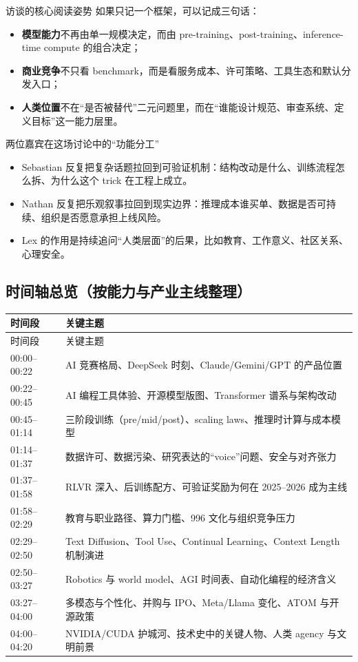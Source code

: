 \documentclass[a4paper]{article}
\begin{document}
\begin{importantbox}{访谈的核心阅读姿势}
如果只记一个框架，可以记成三句话：
\begin{itemize}[leftmargin=1.5em]
    \item \textbf{模型能力}不再由单一规模决定，而由 pre-training、post-training、inference-time compute 的组合决定；
    \item \textbf{商业竞争}不只看 benchmark，而是看服务成本、许可策略、工具生态和默认分发入口；
    \item \textbf{人类位置}不在“是否被替代”二元问题里，而在“谁能设计规范、审查系统、定义目标”这一能力层里。
\end{itemize}
\end{importantbox}

\begin{knowledgebox}{两位嘉宾在这场讨论中的“功能分工”}
\begin{itemize}[leftmargin=1.5em]
    \item Sebastian 反复把复杂话题拉回到可验证机制：结构改动是什么、训练流程怎么拆、为什么这个 trick 在工程上成立。
    \item Nathan 反复把乐观叙事拉回到现实边界：推理成本谁买单、数据是否可持续、组织是否愿意承担上线风险。
    \item Lex 的作用是持续追问“人类层面”的后果，比如教育、工作意义、社区关系、心理安全。
\end{itemize}
\end{knowledgebox}

\subsection{时间轴总览（按能力与产业主线整理）}

\begin{longtable}{p{}p{}}
\toprule
时间段 & 关键主题 \\
\midrule
\endfirsthead
\toprule
时间段 & 关键主题 \\
\midrule
\endhead
00:00--00:22 & AI 竞赛格局、DeepSeek 时刻、Claude/Gemini/GPT 的产品位置 \\
00:22--00:45 & AI 编程工具体验、开源模型版图、Transformer 谱系与架构改动 \\
00:45--01:14 & 三阶段训练（pre/mid/post）、scaling laws、推理时计算与成本模型 \\
01:14--01:37 & 数据许可、数据污染、研究表达的“voice”问题、安全与对齐张力 \\
01:37--01:58 & RLVR 深入、后训练配方、可验证奖励为何在 2025--2026 成为主线 \\
01:58--02:29 & 教育与职业路径、算力门槛、996 文化与组织竞争压力 \\
02:29--02:50 & Text Diffusion、Tool Use、Continual Learning、Context Length 机制演进 \\
02:50--03:27 & Robotics 与 world model、AGI 时间表、自动化编程的经济含义 \\
03:27--04:00 & 多模态与个性化、并购与 IPO、Meta/Llama 变化、ATOM 与开源政策 \\
04:00--04:20 & NVIDIA/CUDA 护城河、技术史中的关键人物、人类 agency 与文明前景 \\
\bottomrule
\end{longtable}
\end{document}
